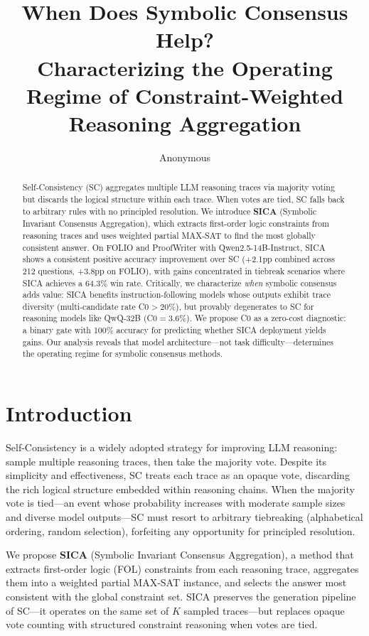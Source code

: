 \documentclass[11pt,a4paper]{article}
\title{When Does Symbolic Consensus Help? \\ Characterizing the Operating Regime of Constraint-Weighted Reasoning Aggregation}
\author{Anonymous}
\begin{document}
\maketitle

\begin{abstract}
Self-Consistency (SC) aggregates multiple LLM reasoning traces via majority voting but discards the logical structure within each trace. When votes are tied, SC falls back to arbitrary rules with no principled resolution. We introduce \textbf{SICA} (Symbolic Invariant Consensus Aggregation), which extracts first-order logic constraints from reasoning traces and uses weighted partial MAX-SAT to find the most globally consistent answer. On FOLIO and ProofWriter with Qwen2.5-14B-Instruct, SICA shows a consistent positive accuracy improvement over SC (+2.1pp combined across 212 questions, +3.8pp on FOLIO), with gains concentrated in tiebreak scenarios where SICA achieves a 64.3\% win rate. Critically, we characterize \emph{when} symbolic consensus adds value: SICA benefits instruction-following models whose outputs exhibit trace diversity (multi-candidate rate C0$>$20\%), but provably degenerates to SC for reasoning models like QwQ-32B (C0$=$3.6\%). We propose C0 as a zero-cost diagnostic: a binary gate with 100\% accuracy for predicting whether SICA deployment yields gains. Our analysis reveals that model architecture---not task difficulty---determines the operating regime for symbolic consensus methods.
\end{abstract}

\section{Introduction}
\label{sec:intro}

Self-Consistency \cite{wang2023selfconsistency} is a widely adopted strategy for improving LLM reasoning: sample multiple reasoning traces, then take the majority vote. Despite its simplicity and effectiveness, SC treats each trace as an opaque vote, discarding the rich logical structure embedded within reasoning chains. When the majority vote is tied---an event whose probability increases with moderate sample sizes and diverse model outputs---SC must resort to arbitrary tiebreaking (alphabetical ordering, random selection), forfeiting any opportunity for principled resolution.

We propose \textbf{SICA} (Symbolic Invariant Consensus Aggregation), a method that extracts first-order logic (FOL) constraints from each reasoning trace, aggregates them into a weighted partial MAX-SAT instance, and selects the answer most consistent with the global constraint set. SICA preserves the generation pipeline of SC---it operates on the same set of $K$ sampled traces---but replaces opaque vote counting with structured constraint reasoning when votes are tied.
\end{document}
